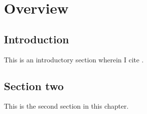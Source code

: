 \chapter{Overview}
\label{ch:over}


\section{Introduction}
\label{over:s:intro}

This is an introductory section wherein I cite \citet[]{carnap1928}.

\section{Section two}

This is the second section in this chapter.
